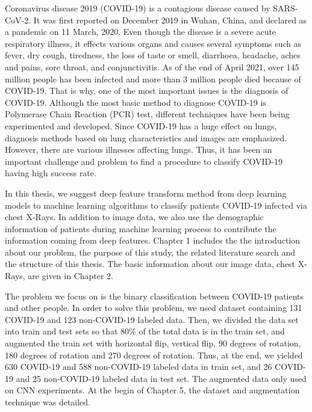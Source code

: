 Coronavirus disease 2019 (COVID-19) is a contagious disease caused by SARS-CoV-2. It was first reported on December 2019 in Wuhan, China, and declared as a pandemic on 11 March, 2020. Even though the disease is a severe acute respiratory illness, it effects various organs and causes several symptoms such as fever, dry cough, tiredness, the loss of taste or smell, diarrhoea, headache, aches and pains, sore throat, and conjunctivitis. As of the end of April 2021, over 145 million people has been infected and more than 3 million people died because of COVID-19. That is why, one of the most important issues is the diagnosis of COVID-19. Although the most basic method to diagnose COVID-19 is Polymerase Chain Reaction (PCR) test, different techniques have been being experimented and developed. Since COVID-19 has a huge effect on lungs, diagnosis methods based on lung characteristics and images are emphasized. However, there are various illnesses affecting lungs. Thus, it has been an important challenge and problem to find a procedure to classify COVID-19 having high success rate.

In this thesis, we suggest deep feature transform method from deep learning models to machine learning algorithms to classify patients COVID-19 infected via chest X-Rays. In addition to image data, we also use the demographic information of patients during machine learning process to contribute the information coming from deep features. Chapter 1 includes the the introduction about our problem, the purpose of this study, the related literature search and the structure of this thesis. The basic information about our image data, chest X-Rays, are given in Chapter 2.

The problem we focus on is the binary classification between COVID-19 patients and other people. In order to solve this problem, we used dataset containing 131 COVID-19 and 123 non-COVID-19 labeled data. Then, we divided the data set into train and test sets so that 80\% of the total data is in the train set, and augmented the train set with horizontal flip, vertical flip, 90 degrees of rotation, 180 degrees of rotation and 270 degrees of rotation. Thus, at the end, we yielded 630 COVID-19 and 588 non-COVID-19 labeled data in train set, and 26 COVID-19 and 25 non-COVID-19 labeled data in test set. The augmented data only used on CNN experiments. At the begin of Chapter 5, the dataset and augmentation technique was detailed.

